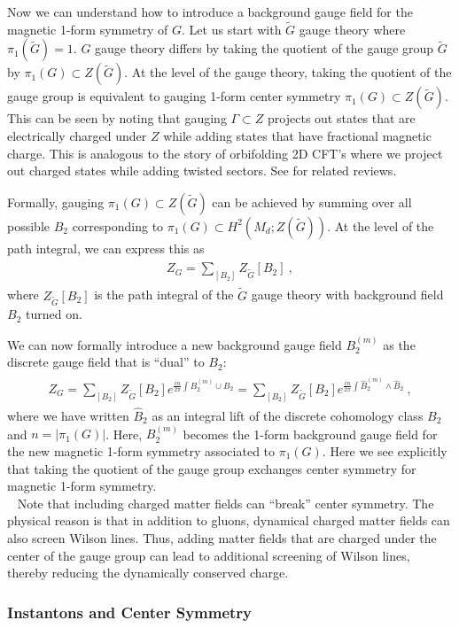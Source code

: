 \documentclass[11pt]{article}
\newcommand{\eq}[1]{\begin{align}\begin{split}#1\end{split}\end{align}}
\newcommand{\twopi}[1]{{\frac{#1}{2\pi}}}
\def\tG{{\widetilde{G}}}
\def\rmk#1{\bigskip\noindent{\bf Remark} }
\begin{document}
Now we can understand how to introduce a background gauge field for the magnetic 1-form  symmetry of $G$.  Let us start with $\tG$ gauge theory where $\pi_1(\tG)=1$. $G$ gauge theory differs by taking the quotient of the gauge group $\tG$ by $\pi_1(G)\subset Z(\tG)$. At the level of the gauge theory, taking the quotient of the gauge group is equivalent to gauging 1-form center symmetry $\pi_1(G)\subset Z(\tG)$. This can be seen by noting that gauging $\Gamma\subset Z$ projects out states that are electrically charged under $Z$ while adding states that have fractional magnetic charge. This is analogous to the story of orbifolding 2D CFT's where we project out charged states while adding twisted sectors. See \cite{DiFrancesco:1997nk,Ginsparg:1988ui} for related reviews.   

Formally, gauging $\pi_1(G)\subset Z(\tG)$ can be achieved by summing over all possible $B_2$ corresponding to $\pi_1(G)\subset H^2(M_d;Z(\tG))$. 
At the level of the path integral, we can express this as
\eq{
Z_G=\sum_{[B_2]}Z_{\tG}[B_2]~,
}
where $Z_{\tG}[B_2]$ is the path integral of the $\tG$ gauge theory with background field $B_2$ turned on. 

We can now formally introduce a new background gauge field $B_2^{(m)}$  as the discrete gauge field that is ``dual'' to $B_2$:
\eq{
Z_G=\sum_{[B_2]}Z_{\tG}[B_2]e^{\twopi{in} \int B_2^{(m)}\cup B_2}=\sum_{[B_2]}Z_{\tG}[B_2]e^{\twopi{in }\int \hat{B}_2^{(m)}\wedge \hat{B}_2}~,
}
where we have written $\hat{B}_2$ as an integral lift of the discrete cohomology class $B_2$ and $n=|\pi_1(G)|$. Here, $B_2^{(m)}$ becomes the 1-form background gauge field for the new magnetic 1-form symmetry associated to $\pi_1(G)$. 
Here we see explicitly that taking the quotient of the gauge group exchanges center symmetry for magnetic 1-form  symmetry. \\ 

\rmk.~
Note that including charged matter fields can ``break'' center symmetry. The physical reason is that in addition to gluons, dynamical charged matter fields can also screen Wilson lines. Thus, adding matter fields that are charged under the center of the gauge group  can lead to additional screening of Wilson lines, thereby reducing the dynamically conserved charge. 

\subsubsection{Instantons and Center Symmetry}
\end{document}
